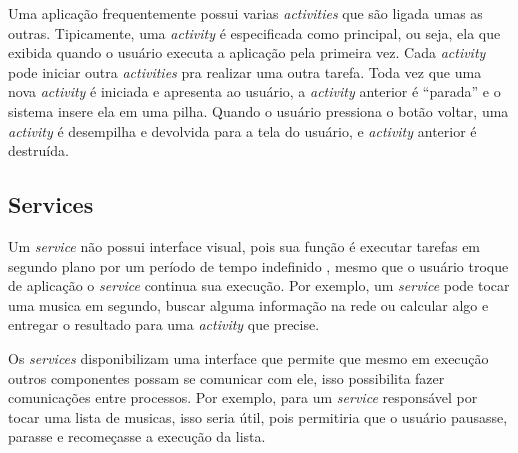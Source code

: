  Uma aplicação frequentemente possui varias \textit{activities} que são ligada umas as outras.  
 Tipicamente, uma \textit{activity} é especificada como principal, ou seja, ela que exibida quando o usuário executa 
 a aplicação pela primeira vez. Cada \textit{activity} pode iniciar outra \textit{activities} pra realizar uma outra tarefa. 
 Toda vez que uma nova \textit{activity} é iniciada e apresenta ao usuário, a \textit{activity} anterior é ``parada'' e o sistema insere ela em uma pilha. 
 Quando o usuário pressiona o botão voltar, uma \textit{activity} é desempilha e devolvida para a tela do usuário, e \textit{activity} anterior é destruída.
 

\subsection{Services}
Um \textit{service} não possui interface visual, pois sua função é 
executar tarefas em segundo plano por um período de tempo indefinido \cite{service}, 
mesmo que o usuário troque de aplicação o \textit{service} continua sua execução.
Por exemplo, um \textit{service} pode tocar uma musica em segundo, buscar alguma informação na rede 
ou calcular algo e entregar o resultado para uma \textit{activity} que precise. 

  Os \textit{services} disponibilizam uma interface que permite que mesmo em execução outros componentes possam se comunicar com ele, 
  isso possibilita fazer comunicações entre processos.
  Por exemplo, para um \textit{service} responsável por tocar uma lista de musicas, isso seria útil, pois permitiria que o usuário pausasse, parasse e 
  recomeçasse a execução da lista.
  
